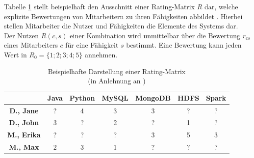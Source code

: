 Tabelle \ref{tab1} stellt beispielhaft den Ausschnitt einer Rating-Matrix $R$ dar, welche explizite Bewertungen von Mitarbeitern zu ihren Fähigkeiten abbildet \cite[S. 735]{adomavicius:inproceedings}\cite[S. 16]{link:booklet}.
Hierbei stellen Mitarbeiter die Nutzer und Fähigkeiten die Elemente des Systems dar.
Der Nutzen $R(c,s)$ einer Kombination wird unmittelbar über die Bewertung $r_{cs}$ eines Mitarbeiters $c$ für eine Fähigkeit $s$ bestimmt.
Eine Bewertung kann jeden Wert in $R_{0}=\{1;2;3;4;5\}$ annehmen.

\begin{table}[htbp]
    \begin{center}
    \begin{tabular}{c|c|c|c|c|c|c}
    {} & {\textbf{Java}} & {\textbf{Python}} & {\textbf{MySQL}} & {\textbf{MongoDB}} & {\textbf{HDFS}} & {\textbf{Spark}}\\
    \hline
    \textbf{D., Jane} & ? & 4 & 3 & 3 & ? & ?\\
    \hline
    \textbf{D., John} & 3 & ? & 2 & ? & 1 & ?\\
    \hline
    \textbf{M., Erika} & ? & ? & ? & 3 & 5 & 3\\
    \hline
    \textbf{M., Max} & 2 & 3 & 1 & ? & ? & ?\\
    \end{tabular}
    \end{center}
    \caption[Beispielhafte Darstellung einer Rating-Matrix ]{Beispielhafte Darstellung einer Rating-Matrix \\
	(in Anlehnung an \cite{link:booklet})}
	\label{tab1}
\end{table}

